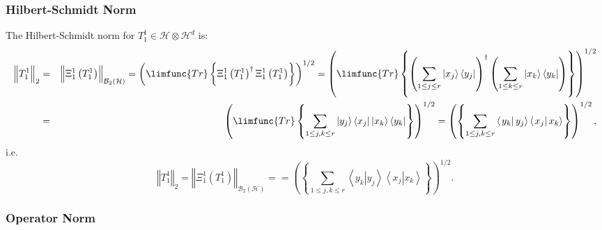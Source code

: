 \documentclass[aps,preprint]{revtex4}
\begin{document}
\subsubsection*{Hilbert-Schmidt Norm}

The Hilbert-Schmidt norm for $T_{1}^{1}\in \mathcal{H}\otimes \mathcal{H}%
^{d} $ is: 
\begin{eqnarray*}
\left\Vert \overset{}{T_{1}^{1}}\right\Vert _{2} &=&\left\Vert \overset{}{%
\Xi _{1}^{1}\left( T_{1}^{1}\right) }\right\Vert _{\mathcal{B}_{2}\left( 
\mathcal{H}\right) }=\left( \limfunc{Tr}\left\{ \overset{}{\Xi
_{1}^{1}\left( T_{1}^{1}\right) ^{\dagger }\Xi _{1}^{1}\left(
T_{1}^{1}\right) }\right\} \right) ^{1/2}=\left( \limfunc{Tr}\left\{ \overset%
{}{\left( \sum_{1\leq j\leq r}\left\vert x_{j}\right\rangle \left\langle
y_{j}\right\vert \right) ^{\dagger }\left( \sum_{1\leq k\leq r}\left\vert
x_{k}\right\rangle \left\langle y_{k}\right\vert \right) }\right\} \right)
^{1/2} \\
&=&\left( \limfunc{Tr}\left\{ \sum_{1\leq j,k\leq r}\left\vert
y_{j}\right\rangle \left\langle x_{j}\right\vert \left\vert
x_{k}\right\rangle \left\langle y_{k}\right\vert \right\} \right)
^{1/2}=\left( \left\{ \overset{}{\sum_{1\leq j,k\leq r}\left\langle \left.
y_{k}\right\vert y_{j}\right\rangle \left\langle \left. x_{j}\right\vert
x_{k}\right\rangle }\right\} \right) ^{1/2},
\end{eqnarray*}%
i.e.%
\begin{equation}
\left\Vert \overset{}{T_{1}^{1}}\right\Vert _{2}=\left\Vert \overset{}{\Xi
_{1}^{1}\left( T_{1}^{1}\right) }\right\Vert _{\mathcal{B}_{2}\left( 
\mathcal{H}\right) }==\left( \left\{ \overset{}{\sum_{1\leq j,k\leq
r}\left\langle \left. y_{k}\right\vert y_{j}\right\rangle \left\langle
\left. x_{j}\right\vert x_{k}\right\rangle }\right\} \right) ^{1/2}.
\end{equation}

\subsubsection*{Operator Norm}
\end{document}
